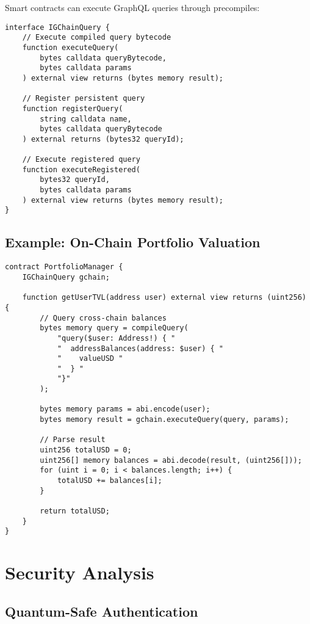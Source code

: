 \documentclass[11pt,a4paper]{article}
\begin{document}
Smart contracts can execute GraphQL queries through precompiles:

\begin{lstlisting}[language=Solidity, basicstyle=\small\ttfamily]
interface IGChainQuery {
    // Execute compiled query bytecode
    function executeQuery(
        bytes calldata queryBytecode,
        bytes calldata params
    ) external view returns (bytes memory result);
    
    // Register persistent query
    function registerQuery(
        string calldata name,
        bytes calldata queryBytecode
    ) external returns (bytes32 queryId);
    
    // Execute registered query
    function executeRegistered(
        bytes32 queryId,
        bytes calldata params
    ) external view returns (bytes memory result);
}
\end{lstlisting}

\subsection{Example: On-Chain Portfolio Valuation}

\begin{lstlisting}[language=Solidity, basicstyle=\small\ttfamily]
contract PortfolioManager {
    IGChainQuery gchain;
    
    function getUserTVL(address user) external view returns (uint256) {
        // Query cross-chain balances
        bytes memory query = compileQuery(
            "query($user: Address!) { "
            "  addressBalances(address: $user) { "
            "    valueUSD "
            "  } "
            "}"
        );
        
        bytes memory params = abi.encode(user);
        bytes memory result = gchain.executeQuery(query, params);
        
        // Parse result
        uint256 totalUSD = 0;
        uint256[] memory balances = abi.decode(result, (uint256[]));
        for (uint i = 0; i < balances.length; i++) {
            totalUSD += balances[i];
        }
        
        return totalUSD;
    }
}
\end{lstlisting}

\section{Security Analysis}

\subsection{Quantum-Safe Authentication}
\end{document}
